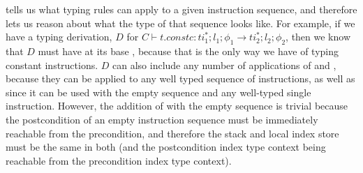  tells us what typing rules can apply to a given \name instruction sequence, and therefore lets us reason about what the type of that sequence looks like.
For example, if we have a typing derivation, $D$ for $C \vdash t.const c : ti_1^{*};l_1;\phi_1 \rightarrow ti_2^{*};l_2;\phi_2$, then we know that $D$ must have at its base , because that is the only way we have of typing constant instructions.
$D$ can also include any number of applications of  and , because they can be applied to any well typed sequence of instructions, as well as  since it can be used with the empty sequence and any well-typed single instruction.
However, the addition of  with the empty sequence is trivial because the postcondition of an empty instruction sequence must be immediately reachable from the precondition, and therefore the stack and local index store must be the same in both (and the postcondition index type context being reachable from the precondition index type context).

